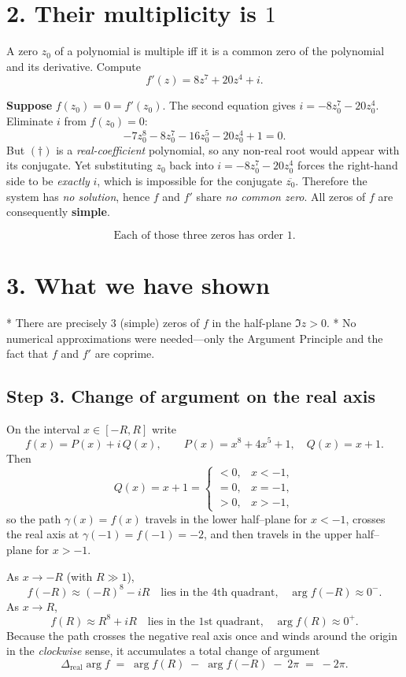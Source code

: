 \documentclass[12pt]{article}
\theoremstyle{definition} %
\theoremstyle{plain} %
\begin{document}
\section*{2.  Their multiplicity is \(1\)}

A zero \(z_{0}\) of a polynomial is multiple
iff it is a common zero of the polynomial and its derivative.
Compute
\[
   f'(z)=8z^{7}+20z^{4}+i.
\]

\medskip
\textbf{Suppose} \(f(z_{0})=0=f'(z_{0})\).
The second equation gives
\(\displaystyle i=-8z_{0}^{7}-20z_{0}^{4}\).
Eliminate \(i\) from \(f(z_{0})=0\):
\[
   -7z_{0}^{8}-8z_{0}^{7}-16z_{0}^{5}-20z_{0}^{4}+1=0.
   \tag{$\dagger$}
\]
But \((\dagger)\) is a \emph{real-coefficient} polynomial,
so any non-real root would appear with its conjugate.
Yet substituting \(z_{0}\) back into
\(i=-8z_{0}^{7}-20z_{0}^{4}\) forces the right-hand side
to be \emph{exactly} \(i\), which is impossible for the conjugate
\(\overline{z_{0}}\).
Therefore the system has \emph{no solution}, hence
\(f\) and \(f'\) share \emph{no common zero}.  
All zeros of \(f\) are consequently \textbf{simple}.

\[
   \boxed{\text{Each of those three zeros has order }1.}
\]

\section*{3.  What we have shown}

* There are precisely \(3\) (simple) zeros of \(f\) in the half-plane
  \(\Im z>0\).
* No numerical approximations were needed—only the  
  Argument Principle and the fact that
  \(f\) and \(f'\) are coprime.
  \subsection*{Step 3. Change of argument on the real axis}

On the interval \(x\in[-R,R]\) write
\[
  f(x)=P(x)+i\,Q(x),
  \qquad
  P(x)=x^8+4x^5+1,
  \quad
  Q(x)=x+1.
\]
Then
\[
  Q(x)=x+1
  =\begin{cases}
     <0,& x<-1,\\
     =0,& x=-1,\\
     >0,& x>-1,
   \end{cases}
\]
so the path \(\gamma(x)=f(x)\) travels in the lower half–plane for \(x<-1\),
crosses the real axis at
\(\gamma(-1)=f(-1)=-2\), and then travels in the upper half–plane for \(x>-1\).

\medskip
As \(x\to -R\) (with \(R\gg1\)), 
\[
  f(-R)\approx(-R)^8 - iR
  \quad\text{lies in the 4th quadrant,}
  \quad
  \arg f(-R)\approx 0^-.
\]
As \(x\to R\),
\[
  f(R)\approx R^8 + iR
  \quad\text{lies in the 1st quadrant,}
  \quad
  \arg f(R)\approx 0^+.
\]
Because the path crosses the negative real axis once and winds around
the origin in the \emph{clockwise} sense, it accumulates a total change
of argument
\[
  \Delta_{\mathrm{real}} \!\arg f
  \;=\;\arg f(R)\;-\;\arg f(-R)
     \;-\;2\pi
  \;=\;-2\pi.
\]
\end{document}
